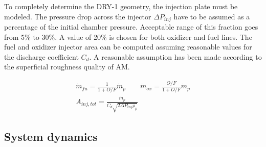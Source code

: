 To completely determine the DRY-1 geometry, the injection plate must be modeled. The pressure drop across the injector $\Delta P_{inj}$ have to be assumed as a percentage of the initial chamber pressure. Acceptable range of this fraction goes from 5\% to 30\%. A value of 20\% is chosen for both oxidizer and fuel lines. The fuel and oxidizer injector area can be computed assuming reasonable values for the discharge coefficient $C_d$. A reasonable assumption has been made according to the superficial roughness quality of AM. 

\begin{gather}
    \dot{m}_{fu} = \frac{1}{1 + O/F}\dot{m}_p \qquad \dot{m}_{ox} = \frac{O/F}{1 + O/F}\dot{m}_p
    \\
    A_{inj,tot} = \frac{\dot{m}_p}{C_d \sqrt{2\Delta P_{inj} \rho_p}} 
\end{gather}

\subsection{System dynamics}
\label{subsec:dynamics}

